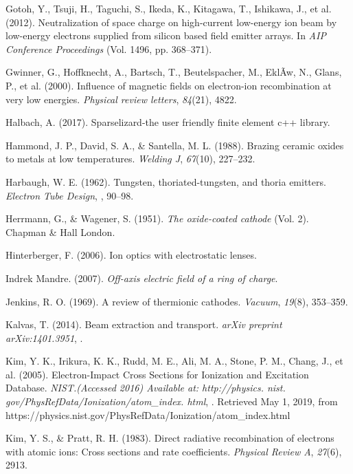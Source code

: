 \documentclass{article}
\begin{document}
\begin{thebibliography}{41}
 Gotoh, Y., Tsuji, H., Taguchi, S., Ikeda, K., Kitagawa, T., Ishikawa, J., et al. (2012). Neutralization of space charge on high-current low-energy ion beam by low-energy electrons supplied from silicon based field emitter arrays. In \textit{AIP Conference Proceedings} (Vol. 1496, pp. 368--371).

 Gwinner, G., Hoffknecht, A., Bartsch, T., Beutelspacher, M., Ekl{\~A}{\textparagraph}w, N., Glans, P., et al. (2000). Influence of magnetic fields on electron-ion recombination at very low energies. \textit{Physical review letters}, \textit{84}(21), 4822.

 Halbach, A. (2017). Sparselizard-the user friendly finite element c++ library.

 Hammond, J. P., David, S. A., \& Santella, M. L. (1988). Brazing ceramic oxides to metals at low temperatures. \textit{Welding J}, \textit{67}(10), 227--232.

 Harbaugh, W. E. (1962). Tungsten, thoriated-tungsten, and thoria emitters. \textit{Electron Tube Design}, , 90--98.

 Herrmann, G., \& Wagener, S. (1951). \textit{The oxide-coated cathode} (Vol. 2). Chapman \& Hall London.

 Hinterberger, F. (2006). Ion optics with electrostatic lenses.

 Indrek Mandre. (2007). \textit{Off-axis electric field of a ring of charge}.

 Jenkins, R. O. (1969). A review of thermionic cathodes. \textit{Vacuum}, \textit{19}(8), 353--359.

 Kalvas, T. (2014). Beam extraction and transport. \textit{arXiv preprint arXiv:1401.3951}, .

 Kim, Y. K., Irikura, K. K., Rudd, M. E., Ali, M. A., Stone, P. M., Chang, J., et al. (2005). Electron-Impact Cross Sections for Ionization and Excitation Database. \textit{NIST.(Accessed 2016) Available at: http://physics. nist. gov/PhysRefData/Ionization/atom_index. html}, . Retrieved May 1, 2019, from https://physics.nist.gov/PhysRefData/Ionization/atom_index.html

 Kim, Y. S., \& Pratt, R. H. (1983). Direct radiative recombination of electrons with atomic ions: Cross sections and rate coefficients. \textit{Physical Review A}, \textit{27}(6), 2913.


\end{thebibliography}
\end{document}
